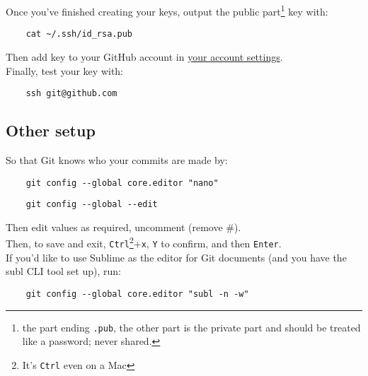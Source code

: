 Once you've finished creating your keys, output the public part\footnote{the part ending  \texttt{.pub}, the other part is the private part and should be treated like a password; never shared.} key with:

\begin{verbatim}
    cat ~/.ssh/id_rsa.pub
\end{verbatim}

Then add key to your GitHub account in \href{https://github.com/settings/ssh}{your account settings}.
\\

Finally, test your key with:

\begin{verbatim}
    ssh git@github.com
\end{verbatim}

\subsection{Other setup}


So that Git knows who your commits are made by:
\begin{verbatim}
    git config --global core.editor "nano"
\end{verbatim}

\begin{verbatim}
    git config --global --edit
\end{verbatim}

Then edit values as required, uncomment (remove \#).
\\

Then, to save and exit, \texttt{Ctrl}\footnote{It's \texttt{Ctrl} even on a Mac}+\texttt{x}, \texttt{Y} to confirm, and then \texttt{Enter}.
\\

If you'd like to use Sublime as the editor for Git documents (and you have the subl CLI tool set up), run:

\begin{verbatim}
    git config --global core.editor "subl -n -w"
\end{verbatim}